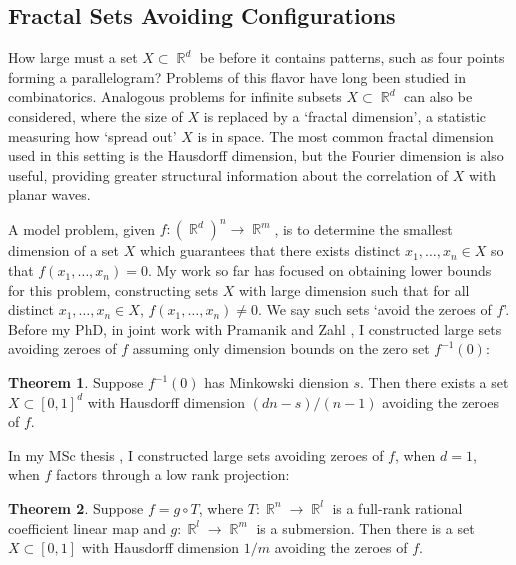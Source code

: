 \documentclass[11pt]{article}
\theoremstyle{definition}
\newtheorem{theorem}{Theorem}
\DeclareMathOperator{\RR}{\mathbb{R}}
\begin{document}
\subsection*{Fractal Sets Avoiding Configurations}

How large must a set $X \subset \RR^d$ be before it contains patterns, such as four points forming a parallelogram? Problems of this flavor have long been studied in combinatorics. Analogous problems for infinite subsets $X \subset \RR^d$ can also be considered, where the size of $X$ is replaced by a `fractal dimension', a statistic measuring how `spread out' $X$ is in space. The most common fractal dimension used in this setting is the Hausdorff dimension, but the Fourier dimension is also useful, providing greater structural information about the correlation of $X$ with planar waves.

A model problem, given $f: (\RR^d)^n \to \RR^m$, is to determine the smallest dimension of a set $X$ which guarantees that there exists distinct $x_1,\dots,x_n \in X$ so that $f(x_1,\dots,x_n) = 0$. My work so far has focused on obtaining lower bounds for this problem, constructing sets $X$ with large dimension such that for all distinct $x_1,\dots,x_n \in X$, $f(x_1,\dots,x_n) \neq 0$. We say such sets `avoid the zeroes of $f$'. %
Before my PhD, in joint work with Pramanik and Zahl \cite{DensonPramanikZahl}, I constructed large sets avoiding zeroes of $f$ assuming only dimension bounds on the zero set $f^{-1}(0)$:

\begin{theorem}
    Suppose $f^{-1}(0)$ has Minkowski diension $s$. Then there exists a set $X \subset [0,1]^d$ with Hausdorff dimension $(dn-s)/(n-1)$ avoiding the zeroes of $f$.
\end{theorem}

In my MSc thesis \cite{DensonThesis}, I constructed large sets avoiding zeroes of $f$, when $d = 1$, when $f$ factors through a low rank projection:

\begin{theorem}
    Suppose $f = g \circ T$, where $T: \RR^n \to \RR^l$ is a full-rank rational coefficient linear map and $g: \RR^l \to \RR^m$ is a submersion. Then there is a set $X \subset [0,1]$ with Hausdorff dimension $1/m$ avoiding the zeroes of $f$.
\end{theorem}
\end{document}
